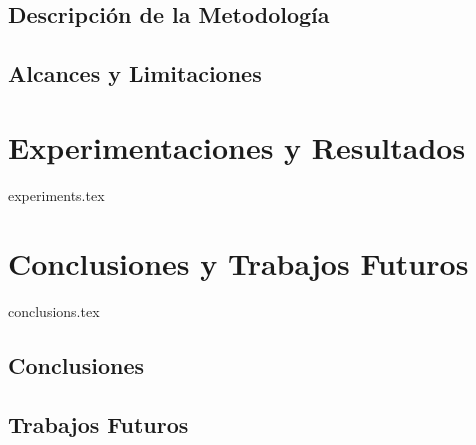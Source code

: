 \documentclass{report}
\begin{document}
\section{Descripción de la Metodología}

\section{Alcances y Limitaciones}

\chapter{Experimentaciones y Resultados}
{experiments.tex}

\chapter{Conclusiones y Trabajos Futuros}
{conclusions.tex}

\section{Conclusiones}

\section{Trabajos Futuros}



%



\end{document}
